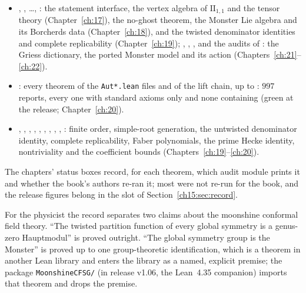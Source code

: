 \begin{itemize}
  headlines are conditional on their explicit hypotheses, which the final theorem discharges.
\item {}, , \dots, : the statement interface, the
  vertex algebra of $\mathrm{II}_{1,1}$ and the tensor theory (Chapter~\ref{ch:17}), the no-ghost theorem, the Monster Lie
  algebra and its Borcherds data (Chapter~\ref{ch:18}), and the twisted denominator identities and complete replicability
  (Chapter~\ref{ch:19}); , , ,
   and the audits of : the Griess
  dictionary, the ported Monster model and its action (Chapters~\ref{ch:21}--\ref{ch:22}).
\item {}: every theorem of the \texttt{Aut*.lean} files and of the lift chain, up to
  : $997$ reports, every one with standard axioms only and none containing 
  (green at the release; Chapter~\ref{ch:20}).
\item {}, , ,
  , , ,
  , , ,
  : finite order, simple-root generation, the untwisted denominator identity, complete
  replicability, Faber polynomials, the prime Hecke identity, nontriviality and the coefficient bounds
  (Chapters~\ref{ch:19}--\ref{ch:20}).
\end{itemize}
The chapters' status boxes record, for each theorem, which audit module prints it and whether the book's authors re-ran
it; most were not re-run for the book, and the release figures belong in the slot of Section~\ref{ch15:sec:record}.

\begin{physics}
For the physicist the record separates two claims about the moonshine conformal field theory. ``The twisted partition
function of every global symmetry is a genus-zero Hauptmodul'' is proved outright. ``The global symmetry group is the
Monster'' is proved up to one group-theoretic identification, which is a theorem in another Lean library and enters
the library as a named, explicit premise; the package \texttt{MoonshineCFSG/} (in release v1.06, the Lean~4.35
companion) imports that theorem and drops the premise.
\end{physics}

